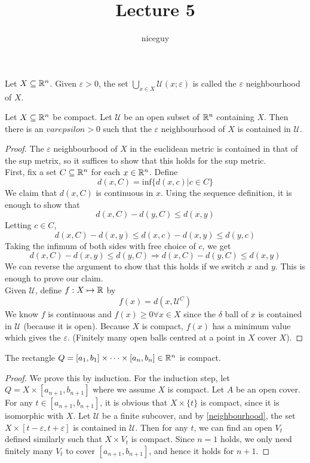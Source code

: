 \documentclass[12pt]{article}
\title{Lecture 5}
\author{niceguy}
\begin{document}
\maketitle

\begin{defn}
    Let $X \subseteq \mathbb{R}^n$. Given $\varepsilon>0$, the set $\bigcup_{x \in X} \mathcal U(x;\varepsilon)$ is called the $\varepsilon$ neighbourhood of $X$.
\end{defn}

\begin{thm}\label{neighbourhood}
    Let $X \subseteq \mathbb{R}^n$ be compact. Let $\mathcal U$ be an open subset of $\mathbb{R}^n$ containing $X$. Then there is an $varepsilon>0$ such that the $\varepsilon$ neighbourhood of $X$ is contained in $\mathcal U$.
\end{thm}

\begin{proof}
    The $\varepsilon$ neighbourhood of $X$ in the euclidean metric is contained in that of the sup metrix, so it suffices to show that this holds for the sup metric. \\
    First, fix a set $C \subseteq \mathbb{R}^n$ for each $x \in \mathbb{R}^n$. Define
    $$d(x,C) = \text{inf}\{d(x,c) | c \in C\}$$
    We claim that $d(x,C)$ is continuous in $x$. Using the sequence definition, it is enough to show that
    $$d(x,C) - d(y,C) \leq d(x,y)$$
    Letting $c \in C$,
    $$d(x,C) - d(x,y) \leq d(x,c) - d(x,y) \leq d(y,c)$$
    Taking the infimum of both sides with free choice of $c$, we get
    $$d(x,C) - d(x,y) \leq d(y,C) \Rightarrow d(x,C) - d(y,C) \leq d(x,y)$$
    We can reverse the argument to show that this holds if we switch $x$ and $y$. This is enough to prove our claim. \\
    Given $\mathcal U$, define $f: X \mapsto \mathbb{R}$ by
    $$f(x) = d(x,\mathcal U^C)$$
    We know $f$ is continuous and $f(x) \geq 0 \forall x \in X$ since the $\delta$ ball of $x$ is contained in $\mathcal U$ (because it is open). Because $X$ is compact, $f(x)$ has a minimum value which gives the $\varepsilon$. (Finitely many open balls centred at a point in $X$ cover $X$).
\end{proof}

\begin{lem}
    The rectangle $Q = [a_1,b_1] \times \dots \times [a_n,b_n] \in \mathbb{R}^n$ is compact.
\end{lem}

\begin{proof}
    We prove this by induction. For the induction step, let $Q = X \times [a_{n+1},b_{n+1}]$ where we assume $X$ is compact. Let $A$ be an open cover. For any $t \in [a_{n+1},b_{n+1}]$, it is obvious that $X \times \{t\}$ is compact, since it is isomorphic with $X$. Let $\mathcal U$ be a finite subcover, and by \ref{neighbourhood}, the set $X \times [t-\varepsilon,t+\varepsilon]$ is contained in $\mathcal U$. Then for any $t$, we can find an open $V_t$ defined similarly such that $X \times V_t$ is compact. Since $n=1$ holds, we only need finitely many $V_t$ to cover $[a_{n+1},b_{n+1}]$, and hence it holds for $n+1$.
\end{proof}
\end{document}
